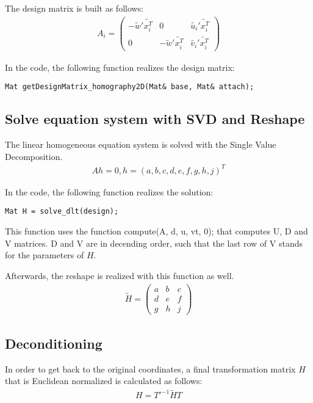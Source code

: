 \documentclass[a4paper,headings=small]{scrartcl}
\numberwithin{equation}{section} %
\numberwithin{figure}{section}   %
\begin{document}
The design matrix is built as follows: \\
\begin{align}
A_{i}=
\left( \begin{array}{ccc}
-\tilde{w}'\tilde{x_i^T} & 0 & \tilde{u_i}'\tilde{x_i^T} \\
0 & -\tilde{w}'\tilde{x_i^T} & \tilde{v_i}'\tilde{x_i^T}
\end{array} \right) 
\end{align}

In the code, the following function realizes the design matrix:
\begin{lstlisting}
Mat getDesignMatrix_homography2D(Mat& base, Mat& attach);
\end{lstlisting}

  \subsection{Solve equation system with SVD and Reshape}

The linear homogeneous equation system is solved with the Single Value Decomposition.
\begin{align}
Ah=0, h=(a,b,c,d,e,f,g,h,j)^T 
\end{align}

In the code, the following function realizes the solution:
\begin{lstlisting}
Mat H = solve_dlt(design);
\end{lstlisting}

This function uses the function compute(A, d, u, vt, 0); that computes U, D and V matrices.
D and V are in decending order, such that the last row of V stands for the parameters of $H$. 

Afterwards, the reshape is realized with this function as well.
\begin{align}
\tilde{H}=
\left( \begin{array}{ccc}
a & b & c \\
d & e & f \\
g & h & j
\end{array} \right)
\end{align}

  \subsection{Deconditioning}
In order to get back to the original coordinates, a final transformation matrix $H$ 
that is Euclidean normalized is calculated as follows:
\begin{align}
H=T'^{-1}\tilde{H}T
\end{align}
\end{document}
